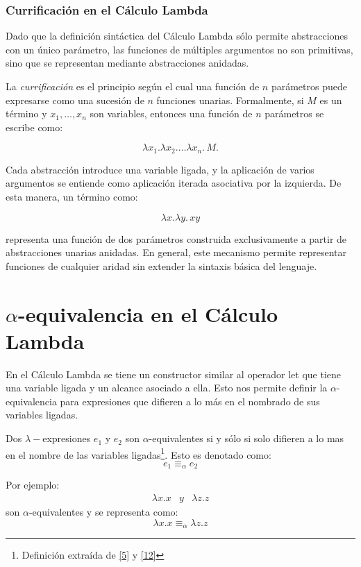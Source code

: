 	\subsubsection{Currificación en el Cálculo Lambda}
	
	Dado que la definición sintáctica del Cálculo Lambda sólo permite abstracciones
	con un único parámetro, las funciones de múltiples argumentos no son primitivas,
	sino que se representan mediante abstracciones anidadas.
	
	La \emph{currificación} es el principio según el cual una función de $n$ parámetros
	puede expresarse como una sucesión de $n$ funciones unarias. 
	Formalmente, si $M$ es un término y $x_1, \dots, x_n$ son variables, entonces
	una función de $n$ parámetros se escribe como:
	
	\[
	\lambda x_1.\lambda x_2.\dots\lambda x_n.\, M.
	\]
	
	Cada abstracción introduce una variable ligada, y la aplicación de varios argumentos
	se entiende como aplicación iterada asociativa por la izquierda. De esta manera, un término como:

	\[
	\lambda x.\lambda y.\, xy
	\]
	
	representa una función de dos parámetros construida exclusivamente a partir
	de abstracciones unarias anidadas. En general, este mecanismo permite representar
	funciones de cualquier aridad sin extender la sintaxis básica del lenguaje.


\section{$\alpha$-equivalencia en el Cálculo Lambda}

    En el Cálculo Lambda se tiene un constructor similar al operador \textsf{let} que tiene una variable ligada y un alcance asociado a ella. Esto nos permite definir la $\alpha$-equivalencia para expresiones que difieren a lo más en el nombrado de sus variables ligadas. 
    \begin{definition}  Dos $\lambda-$expresiones $e_1$ y $e_2$ son $\alpha$-equivalentes si y sólo si solo difieren a lo mas en el nombre de las variables ligadas\footnote{Definición extraída de  \hyperlink{5}{[5]}  y  \hyperlink{12}{[12]}}. Esto es denotado como: $$e_1 \equiv_{\alpha} e_2 $$

     Por ejemplo:
    \[
        \begin{array}{ccc}
        \lambda x.x & y & \lambda z.z
        \end{array}
    \]
    \noindent
    son $\alpha$-equivalentes y se representa como: $$\lambda x.x\equiv_{\alpha}\lambda z.z$$
    \end{definition}


